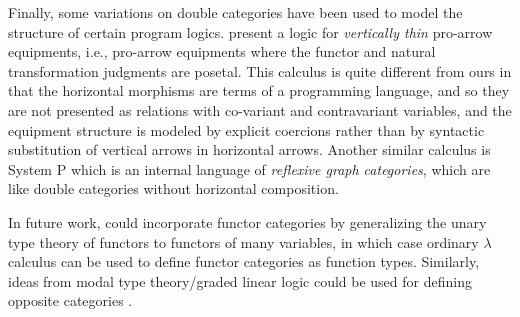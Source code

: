 \documentclass{llncs}
\begin{document}
Finally, some variations on double categories have been used to model
the structure of certain program logics. \citet{newlicata20} present a
logic for \emph{vertically thin} pro-arrow equipments, i.e., pro-arrow
equipments where the functor and natural transformation judgments are
posetal. This calculus is quite different from ours in that the
horizontal morphisms are terms of a programming language, and so they
are not presented as relations with co-variant and contravariant
variables, and the equipment structure is modeled by explicit coercions
rather than by syntactic substitution of vertical arrows in horizontal
arrows. Another similar calculus is System P \citep{systemP} which is an
internal language of \emph{reflexive graph categories}, which are like
double categories without horizontal composition.


In future work, \vett{} could incorporate functor categories by
generalizing the unary type theory of functors to functors of many
variables, in which case ordinary $\lambda$ calculus can be used to
define functor categories as function types. Similarly, ideas from modal
type theory/graded linear logic could be used for defining opposite
categories \cite{mike-contravariance-enrichment,semiring-stuf??}. 



\end{document}
